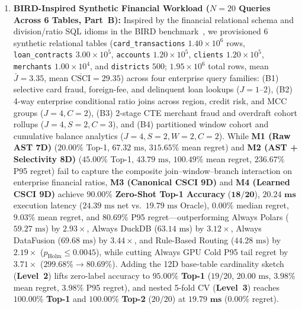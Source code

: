 \documentclass[10pt,a4paper]{article}
\begin{document}
\begin{enumerate}[leftmargin=1.5em,itemsep=0.8pt]
($\mathbf{29/30}$) and $\mathbf{100.00\%}$ \textbf{Top-2} at $\mathbf{20.03\text{ ms}}$ ($0.53\%$ mean regret, $0.00\%$ P95 regret, $\text{ECE}=6.73\%$), while nested 5-fold CV (\textbf{Level~3}) reaches $\mathbf{100.00\%}$ \textbf{Top-1} ($30/30$, $19.88\text{ ms}$).
    \item \textbf{BIRD-Inspired Synthetic Financial Workload ($N=20$ Queries Across 6 Tables, Part~B):} Inspired by the financial relational schema and division/ratio SQL idioms in the BIRD benchmark~\cite{li2023bird}, we provisioned 6 synthetic relational tables (\texttt{card\_transactions} $1.40\times 10^6$ rows, \texttt{loan\_contracts} $3.00\times 10^5$, \texttt{accounts} $1.20\times 10^5$, \texttt{clients} $1.20\times 10^5$, \texttt{merchants} $1.00\times 10^4$, and \texttt{districts} $500$; $1.95\times 10^6$ total rows, mean $\bar{J}=3.35$, mean $\overline{\text{CSCI}}=29.35$) across four enterprise query families: (B1) selective card fraud, foreign-fee, and delinquent loan lookups ($J=1\text{--}2$), (B2) 4-way enterprise conditional ratio joins across region, credit risk, and MCC groups ($J=4, C=2$), (B3) 2-stage CTE merchant fraud and overdraft cohort rollups ($J=4, S=2, C=3$), and (B4) partitioned window cohort and cumulative balance analytics ($J=4, S=2, W=2, C=2$). While \textbf{M1 (Raw AST 7D)} ($20.00\%$ Top-1, $67.32\text{ ms}$, $315.65\%$ mean regret) and \textbf{M2 (AST + Selectivity 8D)} ($45.00\%$ Top-1, $43.79\text{ ms}$, $100.49\%$ mean regret, $236.67\%$ P95 regret) fail to capture the composite join--window--branch interaction on enterprise financial ratios, \textbf{M3 (Canonical CSCI 9D)} and \textbf{M4 (Learned CSCI 9D)} achieve $\mathbf{90.00\%}$ \textbf{Zero-Shot Top-1 Accuracy} ($\mathbf{18/20}$), $\mathbf{20.24\text{ ms}}$ execution latency ($24.39\text{ ms}$ net vs.\ $19.79\text{ ms}$ Oracle), $\mathbf{0.00\%}$ median regret, $\mathbf{9.03\%}$ mean regret, and $\mathbf{80.69\%}$ P95 regret---outperforming Always Polars ($59.27\text{ ms}$) by $\mathbf{2.93\times}$, Always DuckDB ($63.14\text{ ms}$) by $\mathbf{3.12\times}$, Always DataFusion ($69.68\text{ ms}$) by $\mathbf{3.44\times}$, and Rule-Based Routing ($44.28\text{ ms}$) by $\mathbf{2.19\times}$ ($p_{\text{Holm}}\le 0.0045$), while cutting Always GPU Cold P95 tail regret by $\mathbf{3.71\times}$ ($299.68\%\rightarrow 80.69\%$). Adding the 12D base-table cardinality sketch (\textbf{Level~2}) lifts zero-label accuracy to $\mathbf{95.00\%}$ \textbf{Top-1} ($19/20$, $20.00\text{ ms}$, $3.98\%$ mean regret, $3.98\%$ P95 regret), and nested 5-fold CV (\textbf{Level~3}) reaches $\mathbf{100.00\%}$ \textbf{Top-1} and $\mathbf{100.00\%}$ \textbf{Top-2} ($20/20$) at $\mathbf{19.79\text{ ms}}$ ($0.00\%$ regret).

\end{enumerate}
\end{document}
